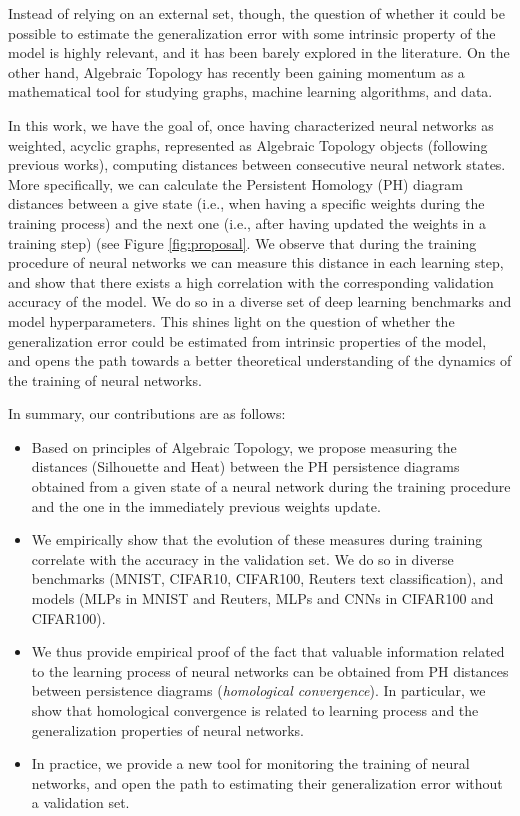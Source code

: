 \documentclass{article}
\begin{document}
Instead of relying on an external set, though, the question of whether it could be possible to estimate the generalization error with some intrinsic property of the model is highly relevant, and it has been barely explored in the literature. On the other hand, Algebraic Topology has recently been gaining momentum as a mathematical tool for studying graphs, machine learning algorithms, and data. 

In this work, we have the goal of, once having characterized neural networks as weighted, acyclic graphs, represented as Algebraic Topology objects (following previous works), computing distances between consecutive neural network states. More specifically, we can calculate the Persistent Homology (PH) diagram distances between a give state (i.e., when having a specific weights during the training process) and the next one (i.e., after having updated the weights in a training step) (see Figure \ref{fig:proposal}. We observe that during the training procedure of neural networks we can measure this distance in each learning step, and show that there exists a high correlation with the corresponding validation accuracy of the model. We do so in a diverse set of deep learning benchmarks and model hyperparameters. This shines light on the question of whether the generalization error could be estimated from intrinsic properties of the model, and opens the path towards a better theoretical understanding of the dynamics of the training of neural networks.

In summary, our contributions are as follows:
\begin{itemize}
    \item Based on principles of Algebraic Topology, we propose measuring the distances (Silhouette and Heat) between the PH persistence diagrams obtained from a given state of a neural network during the training procedure and the one in the immediately previous weights update.
    \item We empirically show that the evolution of these measures during training correlate with the accuracy in the validation set. We do so in diverse benchmarks (MNIST, CIFAR10, CIFAR100, Reuters text classification), and models (MLPs in MNIST and Reuters, MLPs and CNNs in CIFAR100 and CIFAR100).
    \item We thus provide empirical proof of the fact that valuable information related to the learning process of neural networks can be obtained from PH distances between persistence diagrams (\textit{homological convergence}). In particular, we show that homological convergence is related to learning process and the generalization properties of neural networks. 
    \item In practice, we provide a new tool for monitoring the training of neural networks, and open the path to estimating their generalization error without a validation set.
\end{itemize}
\end{document}
